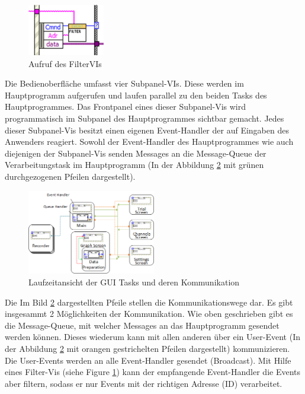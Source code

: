 \documentclass[10pt]{scrartcl}
\begin{document}
\begin{figure}
	\begin{center}
		\includegraphics[width=0.3\textwidth]{filterVI}
		\caption{Aufruf des FilterVIs}
		\label{fig:filterVI}
	\end{center}
\end{figure}
Die Bedienoberfläche umfasst vier Subpanel-VIs. Diese werden im Hauptprogramm aufgerufen und laufen parallel zu den beiden Tasks des Hauptprogrammes. Das \gls{Frontpanel} eines dieser Subpanel-Vis wird programmatisch im Subpanel des Hauptprogrammes sichtbar gemacht.  
Jedes dieser Subpanel-Vis besitzt einen eigenen Event-Handler der auf Eingaben des Anwenders reagiert. Sowohl der Event-Handler des Hauptprogrammes wie auch diejenigen der Subpanel-Vis senden Messages an die Message-Queue der Verarbeitungstask im Hauptprogramm (In der Abbildung \ref{fig:LaufzeitansichtUDA} mit grünen durchgezogenen Pfeilen dargestellt).





\begin{figure}
	\begin{center}
		\includegraphics[width=0.5\textwidth]{LaufzeitansichtMitRecorder}
		\caption{Laufzeitansicht der GUI Tasks und deren Kommunikation}
		\label{fig:LaufzeitansichtUDA}
	\end{center}
\end{figure}
Die Im Bild \ref{fig:LaufzeitansichtUDA} dargestellten Pfeile stellen die Kommunikationswege dar. Es gibt insgesammt 2 Möglichkeiten der Kommunikation. Wie oben geschrieben gibt es die Message-Queue, mit welcher Messages an das Hauptprogramm gesendet werden können. Dieses wiederum kann mit allen anderen über ein User-Event (In der Abbildung \ref{fig:LaufzeitansichtUDA} mit orangen gestrichelten Pfeilen dargestellt) kommunizieren. Die User-Events werden an alle Event-Handler gesendet (Broadcast). Mit Hilfe eines Filter-Vis (siehe Figure \ref{fig:filterVI}) kann der empfangende Event-Handler die Events aber filtern, sodass er nur Events mit der richtigen Adresse (ID) verarbeitet.   
\end{document}
